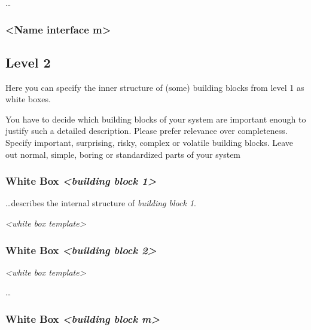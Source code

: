 \ldots{}

\hypertarget{__name_interface_m}{%
\subsubsection{\textless Name interface
m\textgreater{}}\label{__name_interface_m}}

\hypertarget{_level_2}{%
\subsection{Level 2}\label{_level_2}}

Here you can specify the inner structure of (some) building blocks from
level 1 as white boxes.

You have to decide which building blocks of your system are important
enough to justify such a detailed description. Please prefer relevance
over completeness. Specify important, surprising, risky, complex or
volatile building blocks. Leave out normal, simple, boring or
standardized parts of your system

\hypertarget{_white_box_emphasis_building_block_1_emphasis}{%
\subsubsection{\texorpdfstring{White Box \emph{\textless building block
1\textgreater{}}}{White Box \textless building block 1\textgreater{}}}\label{_white_box_emphasis_building_block_1_emphasis}}

\ldots describes the internal structure of \emph{building block 1}.

\emph{\textless white box template\textgreater{}}

\hypertarget{_white_box_emphasis_building_block_2_emphasis}{%
\subsubsection{\texorpdfstring{White Box \emph{\textless building block
2\textgreater{}}}{White Box \textless building block 2\textgreater{}}}\label{_white_box_emphasis_building_block_2_emphasis}}

\emph{\textless white box template\textgreater{}}

\ldots{}

\hypertarget{_white_box_emphasis_building_block_m_emphasis}{%
\subsubsection{\texorpdfstring{White Box \emph{\textless building block
m\textgreater{}}}{White Box \textless building block m\textgreater{}}}\label{_white_box_emphasis_building_block_m_emphasis}}

